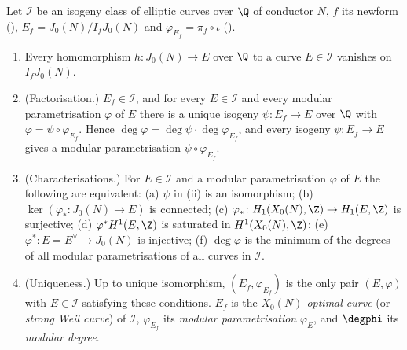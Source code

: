 \begin{theorem}\label{thm:moddeg:optimal}
Let $\mathcal I$ be an isogeny class of elliptic curves over $\Q$ of conductor $N$, $f$ its newform (), $E_f=J_0(N)/I_fJ_0(N)$ and
$\varphi_{E_f}=\pi_f\circ\iota$ ().
\begin{enumerate}[label=(\roman*)]
\item Every homomorphism $h\colon J_0(N)\to E$ over $\Q$ to a curve $E\in\mathcal I$ vanishes on $I_fJ_0(N)$.
\item (Factorisation.) $E_f\in\mathcal I$, and for every $E\in\mathcal I$ and every modular parametrisation $\varphi$ of $E$ there is a unique isogeny $\psi\colon E_f\to E$ over $\Q$ with
$\varphi=\psi\circ\varphi_{E_f}$. Hence $\deg\varphi=\deg\psi\cdot\deg\varphi_{E_f}$, and every isogeny $\psi\colon E_f\to E$ gives a modular parametrisation $\psi\circ\varphi_{E_f}$.
\item (Characterisations.) For $E\in\mathcal I$ and a modular parametrisation $\varphi$ of $E$ the following are equivalent: (a) $\psi$ in (ii) is an isomorphism; (b)
$\ker(\varphi_*\colon J_0(N)\to E)$ is connected; (c) $\varphi_*\colon H_1(X_0(N),\Z)\to H_1(E,\Z)$ is surjective; (d) $\varphi^*H^1(E,\Z)$ is saturated in $H^1(X_0(N),\Z)$; (e)
$\varphi^*\colon E=E^\vee\to J_0(N)$ is injective; (f) $\deg\varphi$ is the minimum of the degrees of all modular parametrisations of all curves in $\mathcal I$.
\item (Uniqueness.) Up to unique isomorphism, $(E_f,\varphi_{E_f})$ is the only pair $(E,\varphi)$ with $E\in\mathcal I$ satisfying these conditions. $E_f$ is the
\emph{$X_0(N)$-optimal curve} (or \emph{strong Weil curve}) of $\mathcal I$, $\varphi_{E_f}$ its \emph{modular parametrisation} $\varphi_E$, and $\degphi$ its \emph{modular degree}.
\end{enumerate}
\end{theorem}


